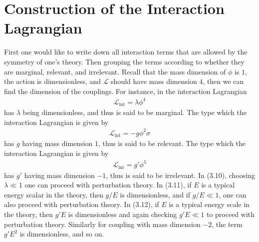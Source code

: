 \documentclass[11pt, onesided]{book}
\theoremstyle{break}
\theoremstyle{break}
\newcommand{\that}[1]{\widetilde{#1}}
\begin{document}
%

\section[Construction of the Interaction Lagrangian]{\color{red} Construction of the Interaction Lagrangian\color{black}}
First one would like to write down all interaction terms that are allowed by the symmetry of one's theory. Then grouping the terms according to whether they are marginal, relevant, and irrelevant. Recall that the mass dimension of $\phi$ is $1$, the action is dimensionless, and $\mathcal{L}$ should have mass dimension $4$, then we can find the dimension of the couplings. For instance, in the interaction Lagrangian
\begin{align}
\mathcal{L}_{\text{int}} = \lambda \phi^4 
\end{align}
has $\lambda$ being dimensionless, and thus is said to be marginal. The type which the interaction Lagrangian is given by
\begin{align}
\mathcal{L}_{\text{int}} = -g \phi^2 \sigma 
\end{align}
has $g$ having mass dimension $1$, thus is said to be relevant. 
The type which the interaction Lagrangian is given by
\begin{align}
\mathcal{L}_{\text{int}} = g' \phi^5
\end{align}
has $g'$ having mass dimension $-1$, thus is said to be irrelevant. In (3.10), choosing $\lambda \ll 1$ one can proceed with perturbation theory. In (3.11), if $E$ is a typical energy scalar in the theory, then $g/E$ is dimensionless, and if $g/E \ll 1$, one can also proceed with perturbation theory. In (3.12), if $E$ is a typical energy scale in the theory, then $g'E$ is dimensionless and again checking $g'E\ll 1$ to proceed with perturbation theory. Similarly for coupling with mass dimension $-2$, the term $g'E^2$ is dimensionless, and so on. 
\end{document}

